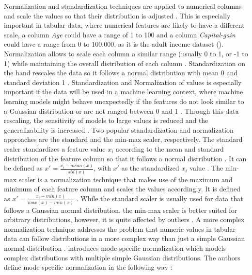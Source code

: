Normalization and standardization techniques are applied to numerical columns and scale the values so that their distribution is adjusted \cite{garcia2016BigDataPreprocessing}.
This is especially important in tabular data, where numerical features are likely to have a different scale, \eg a column \textit{Age} could have a range of 1 to 100 and a column \textit{Capital-gain} could have a range from 0 to 100.000, as it is the adult income dataset \cite{Dua:2019} ().
Normalization allows to scale each column a similar range (usually 0 to 1, or -1 to 1) while maintaining the overall distribution of each column \cite{izonin2022TwoStepDataNormalization}.
Standardization on the hand rescales the data so it follows a normal distribution with mean 0 and standard deviation 1 \cite{scikit-learndevelopers2023PreprocessingData}.
Standardization and Normalization of values is especially important if the data will be used in a machine learning context, where machine learning models might behave unexpectedly if 
the features do not look similar to a Gaussian distribution or are not ranged between 0 and 1 \cite{scikit-learn, scikit-learndevelopers2023PreprocessingData}.
Through this data rescaling, the sensitivity of models to large values is reduced and the generalizability is increased \cite{izonin2022TwoStepDataNormalization}.
Two popular standardization and normalization approaches are the standard and the min-max scaler, respectively.
The standard scaler standardizes a feature value $x_i$ according to the mean and standard distribution of the feature column so that it follows a normal distribution \cite{garcia2016BigDataPreprocessing, izonin2022TwoStepDataNormalization}.
It can be defined as $x' = \frac{x_i-mean(x)}{std(x)}$, with $x'$ as the standardized $x_i$ value \cite{izonin2022TwoStepDataNormalization}.
The min-max scaler is a normalization technique that makes use of the maximum and minimum of each feature column and scales the values accordingly.
It is defined as $x' = \frac{x_i - min(x)}{max(x) - min(x)}$ \cite{izonin2022TwoStepDataNormalization}.
While the standard scaler is usually used for data that follows a Gaussian normal distribution, the min-max scaler is better suited for arbitrary distributions, however, it is quite affected by outliers \cite{choudhury2020FeatureScalingEffect}.
A more complex normalization technique addresses the problem that numeric values in tabular data can follow distributions in a more complex way than just a simple Gaussian normal distribution \cite{zhao2022CTABGANEnhancingTabular, xu2019ModelingTabularData}.
\textcite{xu2019ModelingTabularData} introduces mode-specific normalization which models complex distributions with multiple simple Gaussian distributions.
The authors define mode-specific normalization in the following way \cite[p. 3-4]{xu2019ModelingTabularData}:

